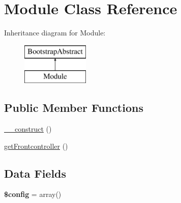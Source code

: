 \hypertarget{class_anemo_1_1_application_1_1_bootstrap_1_1_module}{
\section{Module Class Reference}
\label{class_anemo_1_1_application_1_1_bootstrap_1_1_module}
}
Inheritance diagram for Module:\begin{figure}[H]
\begin{center}
\leavevmode
\includegraphics[height=2.000000cm]{class_anemo_1_1_application_1_1_bootstrap_1_1_module}
\end{center}
\end{figure}
\subsection*{Public Member Functions}
\begin{DoxyCompactItemize}
\item 
\hyperlink{class_anemo_1_1_application_1_1_bootstrap_1_1_module_a095c5d389db211932136b53f25f39685}{\_\-\_\-construct} ()
\item 
\hyperlink{class_anemo_1_1_application_1_1_bootstrap_1_1_module_aa182525e446da02ad9af5d903f3f8f66}{getFrontcontroller} ()
\end{DoxyCompactItemize}
\subsection*{Data Fields}
\begin{DoxyCompactItemize}
\item 
\hypertarget{class_anemo_1_1_application_1_1_bootstrap_1_1_module_a49c7011be9c979d9174c52a8b83e5d8e}{
{\bfseries \$config} = array()}
\label{class_anemo_1_1_application_1_1_bootstrap_1_1_module_a49c7011be9c979d9174c52a8b83e5d8e}

\end{DoxyCompactItemize}

